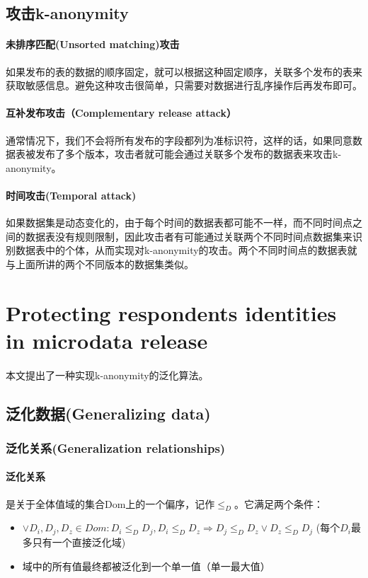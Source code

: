 \documentclass[12pt,a4paper]{article}
\begin{document}
\subsection{攻击k-anonymity}
\paragraph{未排序匹配(Unsorted matching)攻击} 如果发布的表的数据的顺序固定，就可以根据这种固定顺序，关联多个发布的表来获取敏感信息。避免这种攻击很简单，只需要对数据进行乱序操作后再发布即可。
\paragraph{互补发布攻击（Complementary release attack）} 通常情况下，我们不会将所有发布的字段都列为准标识符，这样的话，如果同意数据表被发布了多个版本，攻击者就可能会通过关联多个发布的数据表来攻击k-anonymity。

\paragraph{时间攻击(Temporal attack)} 如果数据集是动态变化的，由于每个时间的数据表都可能不一样，而不同时间点之间的数据表没有规则限制，因此攻击者有可能通过关联两个不同时间点数据集来识别数据表中的个体，从而实现对k-anonymity的攻击。两个不同时间点的数据表就与上面所讲的两个不同版本的数据集类似。

\section{Protecting respondents identities in microdata release \cite{samarati2001}}
\paragraph{} 本文提出了一种实现k-anonymity的泛化算法。

\subsection{泛化数据(Generalizing data)}
\subsubsection{泛化关系(Generalization relationships)}
\paragraph{泛化关系} 是关于全体值域的集合Dom上的一个偏序，记作$ \leq_D $。它满足两个条件：
\begin{itemize}
	\item $ \vee D_i,D_j,D_z \in Dom  : D_i \leq_D D_j,  D_i \leq_D D_z \Rightarrow D_j \leq_D D_z \vee D_z \leq_D D_j $ (每个$D_i$最多只有一个直接泛化域)
	\item 域中的所有值最终都被泛化到一个单一值（单一最大值）
\end{itemize}
\end{document}
